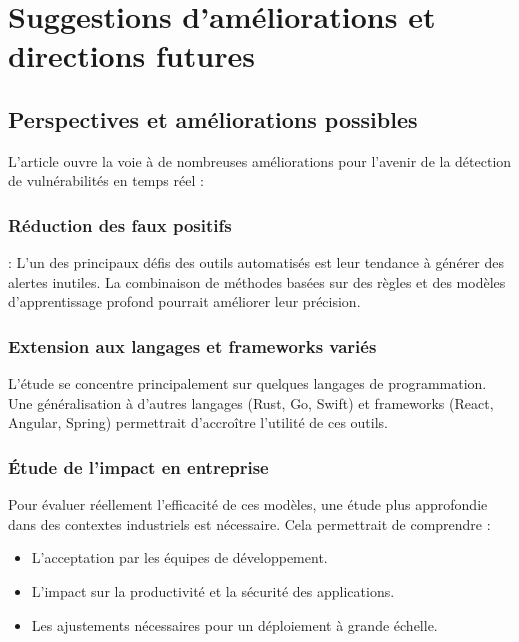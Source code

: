 \chapter{Suggestions d'améliorations et directions futures}



\section{Perspectives et améliorations possibles}



L’article ouvre la voie à de nombreuses améliorations pour l’avenir de la détection de
vulnérabilités en temps réel :




 \subsection{Réduction des faux positifs} : L’un des principaux défis des outils
     automatisés est leur tendance à générer des alertes inutiles. La
     combinaison de méthodes basées sur des règles et des modèles
     d’apprentissage profond pourrait améliorer leur précision.



\subsection{Extension aux langages et frameworks variés}



L’étude se concentre principalement sur quelques langages de programmation. Une
généralisation à d’autres langages (Rust, Go, Swift) et frameworks (React,
Angular, Spring) permettrait d’accroître l’utilité de ces outils.

\subsection{Étude de l’impact en entreprise}

Pour évaluer
réellement l’efficacité de ces modèles, une étude plus approfondie dans des
contextes industriels est nécessaire. Cela permettrait de comprendre :

\begin{itemize}

 \item L’acceptation
     par les équipes de développement.

 \item L’impact
     sur la productivité et la sécurité des applications.

 \item Les
     ajustements nécessaires pour un déploiement à grande échelle.

\end{itemize}



